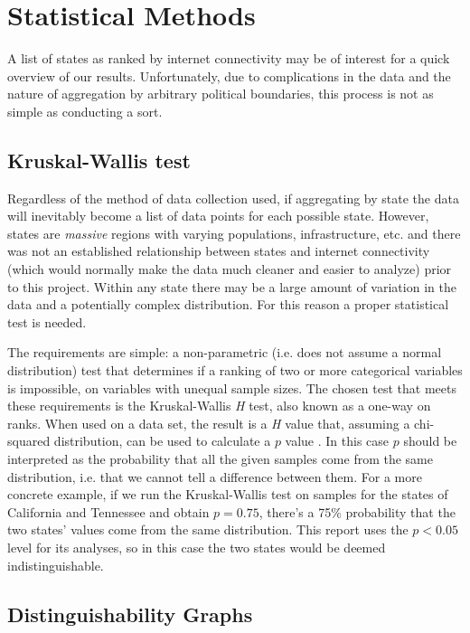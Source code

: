 \section{Statistical Methods}\label{sec:stats_methods}
A list of states as ranked by internet connectivity may be of interest for a quick overview of our results. Unfortunately, due to complications in the data and the nature of aggregation by arbitrary political boundaries, this process is not as simple as conducting a sort.

\subsection{Kruskal-Wallis test}

Regardless of the method of data collection used, if aggregating by state the data will inevitably become a list of data points for each possible state. However, states are \textit{massive} regions with varying populations, infrastructure, etc. and there was not an established relationship between states and internet connectivity (which would normally make the data much cleaner and easier to analyze) prior to this project. Within any state there may be a large amount of variation in the data and a potentially complex distribution. For this reason a proper statistical test is needed.

The requirements are simple: a non-parametric (i.e. does not assume a normal distribution) test that determines if a ranking of two or more categorical variables is impossible, on variables with unequal sample sizes. The chosen test that meets these requirements is the Kruskal-Wallis \textit{H} test, also known as a one-way \anova on ranks. When used on a data set, the result is a \textit{H} value that, assuming a chi-squared distribution, can be used to calculate a $p$ value \cite{kruskal-wallis}. In this case $p$ should be interpreted as the probability that all the given samples come from the same distribution, i.e. that we cannot tell a difference between them. For a more concrete example, if we run the Kruskal-Wallis test on samples for the states of California and Tennessee and obtain $p=0.75$, there's a 75\% probability that the two states' values come from the same distribution. This report uses the $p<0.05$ level for its analyses, so in this case the two states would be deemed indistinguishable.

\subsection{Distinguishability Graphs}

